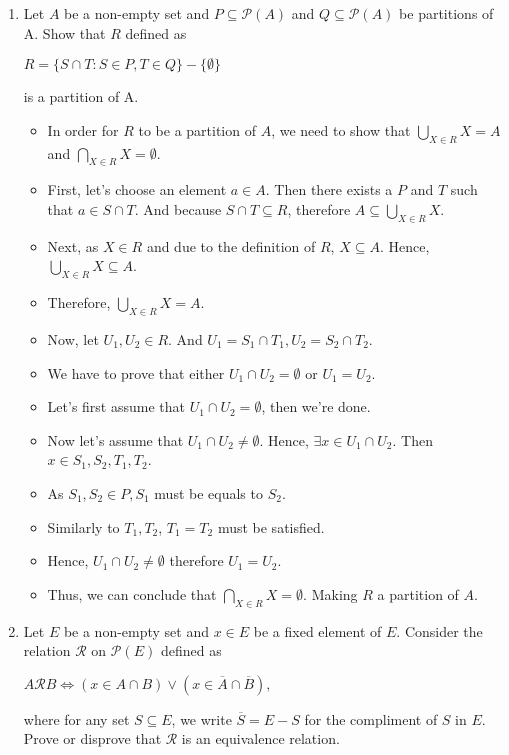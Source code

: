 \documentclass[letterpaper,12pt]{article}
\begin{document}
\begin{enumerate}
\begin{itemize}
\end{itemize}
\item Let $A$ be a non-empty set and $P \subseteq \mathcal{P}(A) $ and $Q \subseteq \mathcal{P}(A)$ be partitions of A. Show that $R$ defined as 
\begin{center}
	$R = \{S \cap T: S \in P, T \in Q\} - \{\emptyset\}$
\end{center}
is a partition of A.
\begin{itemize}
	\item In order for $R$ to be a partition of $A$, we need to show that $\bigcup_{X \in R}X = A$ and $\bigcap_{X\in R}X = \emptyset$.
	\item First, let's choose an element $a\in A$. Then there exists a $P $ and $ T$ such that $a \in S \cap T$. And because $S \cap T \subseteq R$, therefore $A \subseteq \bigcup_{X \in R}X$.
	\item Next, as $X \in R$ and due to the definition of $R$, $X \subseteq A$. Hence, $\bigcup_{X \in R}X \subseteq A$.
	\item Therefore, $\bigcup_{X \in R}X = A$.
	\item Now, let $U_1,U_2 \in R$. And $U_1 = S_1 \cap T_1, U_2 = S_2 \cap T_2$.
	\item We have to prove that either $U_1\cap U_2 = \emptyset$ or $U_1 = U_2$.
	\item Let's first assume that $U_1 \cap U_2 = \emptyset$, then we're done.
	\item Now let's assume that $U_1 \cap U_2 \neq \emptyset$. Hence, $\exists x \in U_1 \cap U_2$. Then $x \in S_1,S_2,T_1,T_2$.
	\item As $S_1,S_2 \in P, S_1$ must be equals to $S_2.$
	\item Similarly to $T_1,T_2$, $T_1 = T_2$ must be satisfied.
	\item Hence, $U_1 \cap U_2 \neq \emptyset$ therefore $U_1=U_2$.
	\item Thus, we can conclude that $\bigcap_{X\in R}X = \emptyset$. Making $R$ a partition of $A$.
\end{itemize}
\item Let $E$ be a non-empty set and $x \in E$ be a fixed element of $E$. Consider the relation $\mathcal{R}$ on $\mathcal{P}(E)$ defined as 
\begin{center}
	$A \mathrel \mathcal{R} B \Longleftrightarrow(x \in A \cap B) \vee(x\in \overline{A} \cap \overline{B}), $
\end{center}
where for any set $S \subseteq E$, we write $\overline{S} = E - S$ for the compliment of $S$ in $E$. Prove or disprove that $\mathcal R$ is an equivalence relation.

\end{enumerate}
\end{document}
